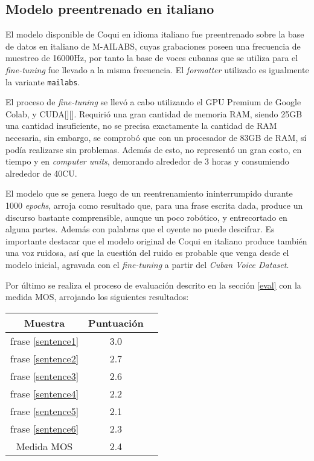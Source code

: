 \subsection{Modelo preentrenado en italiano}
El modelo disponible de Coqui en idioma italiano fue preentrenado sobre la base de datos en italiano de M-AILABS, cuyas grabaciones poseen una frecuencia de muestreo de 16000Hz, por tanto la base de voces cubanas que se utiliza para el \textit{fine-tuning} fue llevado a la misma frecuencia.
El \textit{formatter} utilizado es igualmente la variante \texttt{mailabs}.

El proceso de \textit{fine-tuning} se llevó a cabo utilizando el GPU Premium de Google Colab, y CUDA[\cite{cuda}][\cite{cuda1}]. Requirió una gran cantidad de memoria RAM, siendo 25GB una cantidad insuficiente, no se precisa exactamente la cantidad de RAM necesaria, sin embargo, se comprobó que con un procesador de 83GB de RAM, sí podía realizarse sin problemas. Además de esto, no representó un gran costo, en tiempo y en \textit{computer units}, demorando alrededor de 3 horas y consumiendo alrededor de 40CU.

El modelo que se genera luego de un reentrenamiento ininterrumpido durante 1000 \textit{epochs}, arroja como resultado que, para una frase escrita dada, produce un discurso bastante comprensible, aunque un poco robótico, y entrecortado en alguna partes. Además con palabras que el oyente no puede descifrar. Es importante destacar que el modelo original de Coqui en italiano produce también una voz ruidosa, así que la cuestión del ruido es probable que venga desde el modelo inicial, agravada con el \textit{fine-tuning} a partir del \textit{Cuban Voice Dataset}.

Por último se realiza el proceso de evaluación descrito en la sección \ref{eval} con la medida MOS, arrojando los siguientes resultados:

\begin{center} \begin{tabular}{ |c|c|c| } 
		\hline 
		Muestra & Puntuación \\
		\hline
		frase \ref{sentence1} & 3.0 \\
		frase \ref{sentence2} & 2.7 \\
		frase \ref{sentence3} & 2.6 \\
		frase \ref{sentence4} & 2.2 \\
		frase \ref{sentence5} & 2.1 \\
		frase \ref{sentence6} & 2.3 \\
		\hline
		Medida MOS & 2.4\\
		\hline 
	\end{tabular} 
\end{center}

